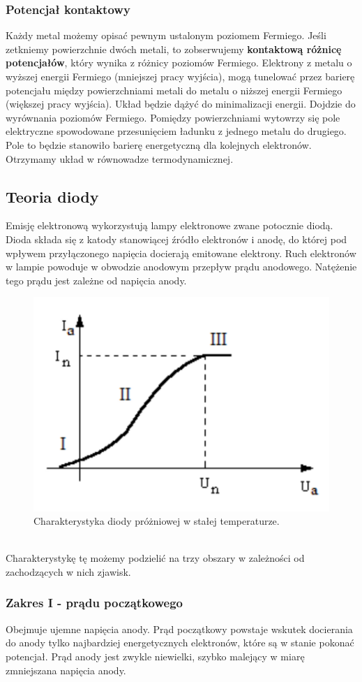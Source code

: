 \documentclass[paper=a4, fontsize=12pt]{scrartcl}
\begin{document}
\subsubsection{Potencjał kontaktowy}
Każdy metal możemy opisać pewnym ustalonym poziomem Fermiego. Jeśli zetkniemy powierzchnie dwóch metali, to zobserwujemy \textbf{kontaktową różnicę potencjałów}, który wynika z różnicy poziomów Fermiego. Elektrony z metalu o wyższej energii Fermiego (mniejszej pracy wyjścia), mogą tunelować przez barierę potencjału między powierzchniami metali do metalu o niższej energii Fermiego (większej pracy wyjścia). Układ będzie dążyć do minimalizacji energii. Dojdzie do wyrównania poziomów Fermiego. Pomiędzy powierzchniami wytowrzy się pole elektryczne spowodowane przesunięciem ładunku z jednego metalu do drugiego. Pole to będzie stanowiło barierę energetyczną dla kolejnych elektronów. Otrzymamy układ w równowadze termodynamicznej.
\subsection{Teoria diody}
Emisję elektronową wykorzystują lampy elektronowe zwane potocznie diodą. Dioda składa się z katody stanowiącej źródło elektronów i anodę, do której pod wpływem przyłączonego napięcia docierają emitowane elektrony. Ruch elektronów w lampie powoduje w obwodzie anodowym przepływ prądu anodowego. Natężenie tego prądu jest zależne od napięcia anody.  
\begin{figure}
\centering
\includegraphics[width=0.4\linewidth]{dioda}
\caption{Charakterystyka diody próżniowej w stałej temperaturze.}
\label{fig:dioda}
\end{figure}\\
Charakterystykę tę możemy podzielić na trzy obszary w zależności od zachodzących w nich zjawisk.
\subsubsection{Zakres I - prądu początkowego}
	
	Obejmuje ujemne napięcia anody. Prąd początkowy powstaje wskutek docierania do anody tylko najbardziej energetycznych elektronów, które są w stanie pokonać potencjał. Prąd anody jest zwykle niewielki, szybko malejący w miarę zmniejszana napięcia anody.
\end{document}
